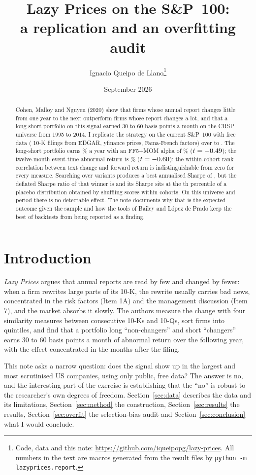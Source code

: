 \documentclass[11pt,a4paper]{article}
\title{\textbf{Lazy Prices on the S\&P~100:\\a replication and an overfitting audit}}
\author{Ignacio Queipo de Llano\thanks{Code, data and this note: \url{https://github.com/iqueipopg/lazy-prices}. All numbers in the text are macros generated from the result files by \texttt{python -m lazyprices.report}.}}
\date{September 2026}
\begin{document}
\maketitle

\begin{abstract}
\noindent Cohen, Malloy and Nguyen (2020) show that firms whose annual report changes little from one year to the next outperform firms whose report changes a lot, and that a long-short portfolio on this signal earned 30 to 60 basis points a month on the CRSP universe from 1995 to 2014. I replicate the strategy on the current S\&P~100 with free data (\nFilings{} 10-K filings from EDGAR, yfinance prices, Fama-French factors) over \sampleStart{} to \sampleEnd. The long-short portfolio earns \LSmean\% a year with an FF5+MOM alpha of \LSalphaFFfive\% ($t = -0.49$); the twelve-month event-time abnormal return is \carLS\% ($t = -0.60$); the within-cohort rank correlation between text change and forward return is indistinguishable from zero for every measure. Searching over \nTrials{} variants produces a best annualised Sharpe of \bestSharpe, but the deflated Sharpe ratio of that winner is \dsrRaw{} and its Sharpe sits at the \placeboBestPct th percentile of a placebo distribution obtained by shuffling scores within cohorts. On this universe and period there is no detectable effect. The note documents why that is the expected outcome given the sample and how the tools of Bailey and L\'opez de Prado keep the best of \nTrials{} backtests from being reported as a finding.
\end{abstract}

\section{Introduction}

\emph{Lazy Prices} argues that annual reports are read by few and changed by fewer: when a firm rewrites large parts of its 10-K, the rewrite usually carries bad news, concentrated in the risk factors (Item 1A) and the management discussion (Item 7), and the market absorbs it slowly. The authors measure the change with four similarity measures between consecutive 10-Ks and 10-Qs, sort firms into quintiles, and find that a portfolio long ``non-changers'' and short ``changers'' earns 30 to 60 basis points a month of abnormal return over the following year, with the effect concentrated in the months after the filing.

This note asks a narrow question: does the signal show up in the largest and most scrutinised US companies, using only public, free data? The answer is no, and the interesting part of the exercise is establishing that the ``no'' is robust to the researcher's own degrees of freedom. Section~\ref{sec:data} describes the data and its limitations, Section~\ref{sec:method} the construction, Section~\ref{sec:results} the results, Section~\ref{sec:overfit} the selection-bias audit and Section~\ref{sec:conclusion} what I would conclude.
\end{document}
